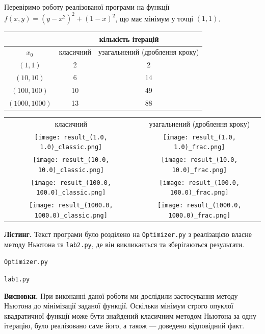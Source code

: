 \documentclass{extreport}
\begin{document}
Перевіримо роботу реалізованої програми на функції $f(x, y) = (y - x^2)^2 + (1 - x)^2$,
що має мінімум у точці $(1, 1)$.
\begin{center}
    \begin{tabular}{|c|c|c|}
        \hline
        {} & \multicolumn{2}{c|}{кількість ітерацій}\\
        \hline
        $x_0$ & {класичний} & {узагальнений (дроблення кроку)}\\
        \hline
        $(1, 1)$ & 2 & 2 \\
        \hline
        $(10, 10)$ & 6 & 14 \\
        \hline
        $(100, 100)$ & 10 & 49 \\
        \hline
        $(1000, 1000)$ & 13 & 88 \\
        \hline
    \end{tabular}
\end{center}

\begin{center}

    \begin{tabular}{c c}
        {класичний} & {узагальнений (дроблення кроку)}\\
        \texttt{[image: result\_(1.0, 1.0)\_classic.png]} &
        \texttt{[image: result\_(1.0, 1.0)\_frac.png]} \\
        \texttt{[image: result\_(10.0, 10.0)\_classic.png]} &
        \texttt{[image: result\_(10.0, 10.0)\_frac.png]} \\
        \texttt{[image: result\_(100.0, 100.0)\_classic.png]} &
        \texttt{[image: result\_(100.0, 100.0)\_frac.png]} \\
        \texttt{[image: result\_(1000.0, 1000.0)\_classic.png]} &
        \texttt{[image: result\_(1000.0, 1000.0)\_frac.png]}
    \end{tabular}
\end{center}

\noindent\textbf{Лістинг.}
Текст програми було розділено на \texttt{Optimizer.py} з реалізацією
власне методу Ньютона та \texttt{lab2.py}, де він викликається та зберігаються результати.

\noindent\texttt{Optimizer.py}


\noindent\texttt{lab1.py}


\noindent\textbf{Висновки.} При виконанні даної роботи ми дослідили
застосування методу Ньютона до мінімізації заданої функції.
Оскільки мінімум строго опуклої квадратичної функції може бути знайдений класичним методом Ньютона
за одну ітерацію, було реалізовано саме його, а також --- доведено відповідний факт.
\end{document}
